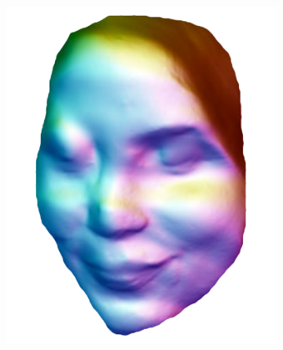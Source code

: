 \begin{figure}
\begin{subfigure}{0.23\textwidth}
        \includegraphics[width=\textwidth]{statistical_normals/images/sirfs_borrowed/sirfs_normals1}
\label{subfig:sirfs-1-normals}
    \end{subfigure}
    \begin{subfigure}{0.23\textwidth}
        \centering

\end{subfigure}
\end{figure}
